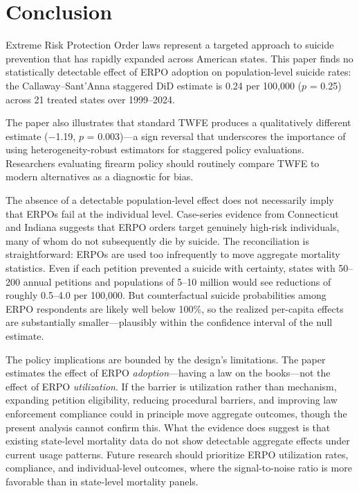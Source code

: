 \documentclass[12pt]{article}
\begin{document}
\section{Conclusion}

Extreme Risk Protection Order laws represent a targeted approach to suicide prevention that has rapidly expanded across American states. This paper finds no statistically detectable effect of ERPO adoption on population-level suicide rates: the Callaway--Sant'Anna staggered DiD estimate is 0.24 per 100,000 ($p$ = 0.25) across 21 treated states over 1999--2024.

The paper also illustrates that standard TWFE produces a qualitatively different estimate ($-$1.19, $p$ = 0.003)---a sign reversal that underscores the importance of using heterogeneity-robust estimators for staggered policy evaluations. Researchers evaluating firearm policy should routinely compare TWFE to modern alternatives as a diagnostic for bias.

The absence of a detectable population-level effect does not necessarily imply that ERPOs fail at the individual level. Case-series evidence from Connecticut and Indiana suggests that ERPO orders target genuinely high-risk individuals, many of whom do not subsequently die by suicide. The reconciliation is straightforward: ERPOs are used too infrequently to move aggregate mortality statistics. Even if each petition prevented a suicide with certainty, states with 50--200 annual petitions and populations of 5--10 million would see reductions of roughly 0.5--4.0 per 100,000. But counterfactual suicide probabilities among ERPO respondents are likely well below 100\%, so the realized per-capita effects are substantially smaller---plausibly within the confidence interval of the null estimate.

The policy implications are bounded by the design's limitations. The paper estimates the effect of ERPO \textit{adoption}---having a law on the books---not the effect of ERPO \textit{utilization}. If the barrier is utilization rather than mechanism, expanding petition eligibility, reducing procedural barriers, and improving law enforcement compliance could in principle move aggregate outcomes, though the present analysis cannot confirm this. What the evidence does suggest is that existing state-level mortality data do not show detectable aggregate effects under current usage patterns. Future research should prioritize ERPO utilization rates, compliance, and individual-level outcomes, where the signal-to-noise ratio is more favorable than in state-level mortality panels.
\end{document}
